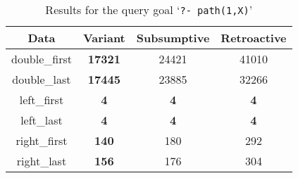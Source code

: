 \begin{table}[ht]
\centering
\footnotesize{
  \begin{tabular}{c|ccc}
   \hline
    \hline
    \multicolumn{1}{c|}{\small{\textbf{Data}}} & \textbf{\small{Variant}} & \textbf{\small{Subsumptive}} & \textbf{\small{Retroactive}} \\
   \hline
   \hline

double\_first &  \textbf{17321}  &  24421  &  41010 \\
double\_last &  \textbf{17445}  &  23885  &  32266 \\
left\_first &  \textbf{4}  &  \textbf{4}  &  \textbf{4} \\
left\_last &  \textbf{4}  &  \textbf{4}  &  \textbf{4} \\
right\_first &  \textbf{140}  &  180  &  292 \\
right\_last &  \textbf{156}  &  176  &  304 \\
\hline
\hline
\end{tabular}
}
\caption{Results for the query goal `\texttt{?-~path(1,X)}'}
\label{tbl:results_path_1x}
\end{table}